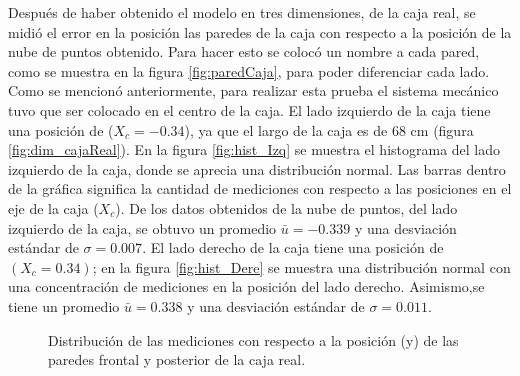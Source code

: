 Después de haber obtenido el modelo en tres dimensiones, de la caja real, se midió 
el error en la posición las paredes de la caja con respecto a la posición de la nube 
de puntos obtenido. Para hacer esto se colocó un nombre a cada pared, como se muestra en 
la figura \ref{fig:paredCaja}, para poder diferenciar cada lado. Como se mencionó 
anteriormente, para realizar esta prueba el sistema mecánico tuvo que ser colocado en 
el centro de la caja. El lado izquierdo de la caja tiene una posición de ($X_{c} = 
-0.34$), ya que el largo de la caja es de 68 cm (figura \ref{fig:dim_cajaReal}). En 
la figura \ref{fig:hist_Izq} se muestra el histograma del lado izquierdo de la caja, 
donde se aprecia una distribución normal. Las barras dentro de la gráfica significa la
cantidad de mediciones con respecto a las posiciones en el eje de la caja ($X_{c}$). De los 
datos obtenidos de la nube de puntos, del lado izquierdo de la caja, se obtuvo un 
promedio $\bar{u} = -0.339$ y una desviación estándar de $\sigma = 0.007$. El lado 
derecho de la caja tiene una posición de $(X_{c} = 0.34)$; en la figura \ref{fig:hist_Dere} 
se muestra una distribución normal con una concentración de mediciones en la posición del 
lado derecho. Asimismo,se tiene un promedio $\bar{u} = 0.338$ y una desviación estándar 
de $\sigma = 0.011$.  

\begin{figure}[ht!]
     \begin{center}
    \end{center}
  \captionsetup{font=footnotesize}
    \caption{\label{}Distribución de las mediciones con respecto a la posición (y) de las 
    paredes frontal y posterior de la caja real.}
\end{figure}


